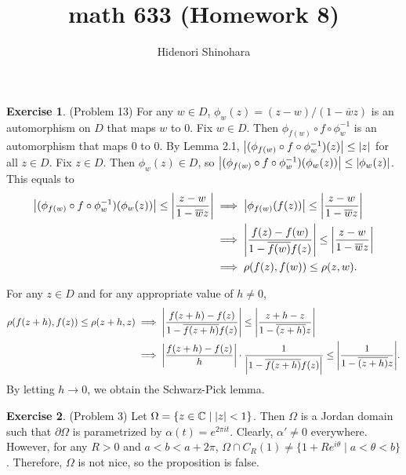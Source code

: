 \documentclass[12pt, psamsfonts]{amsart}
\theoremstyle{definition}
\newtheorem*{exer}{Exercise}
\theoremstyle{remark}
\numberwithin{equation}{section}
\begin{document}
\title{math 633 (Homework 8)}
\author{Hidenori Shinohara}
\maketitle

\begin{exer}{(Problem 13)}
  For any $w \in D$, $\phi_w(z) = (z - w) / (1 - \overline{w}z)$ is an automorphism on $D$ that maps $w$ to $0$.
  Fix $w \in D$.
  Then $\phi_{f(w)} \circ f \circ \phi_w^{-1}$ is an automorphism that maps 0 to 0.
  By Lemma 2.1, $\abs{(\phi_{f(w)} \circ f \circ \phi_w^{-1})(z)} \leq \abs{z}$ for all $z \in D$.
  Fix $z \in D$.
  Then $\phi_w(z) \in D$, so $\abs{(\phi_{f(w)} \circ f \circ \phi_w^{-1})(\phi_w(z))} \leq \abs{\phi_w(z)}$.
  This equals to
  \begin{align*}
    \abs{(\phi_{f(w)} \circ f \circ \phi_w^{-1})(\phi_w(z))} \leq \abs{\frac{z - w}{1 - \overline{w}z}}
      &\implies \abs{\phi_{f(w)}(f(z))} \leq \abs{\frac{z - w}{1 - \overline{w}z}} \\
      &\implies \abs{\frac{f(z) - f(w)}{1 - \overline{f(w)}f(z)}} \leq \abs{\frac{z - w}{1 - \overline{w}z}} \\
      &\implies \rho(f(z), f(w)) \leq \rho(z, w).
  \end{align*}

  For any $z \in D$ and for any appropriate value of $h \ne 0$,
  \begin{align*}
    \rho(f(z + h), f(z)) \leq \rho(z + h, z)
      &\implies \abs{\frac{f(z + h) - f(z)}{1 - \overline{f(z + h)}f(z)}} \leq \abs{\frac{z + h - z}{1 - \overline{(z + h)}z}} \\
      &\implies \abs{\frac{f(z + h) - f(z)}{h}} \cdot \frac{1}{\abs{1 - \overline{f(z + h)}f(z)}} \leq \abs{\frac{1}{1 - \overline{(z + h)}z}}.
  \end{align*}
  By letting $h \rightarrow 0$, we obtain the Schwarz-Pick lemma.
\end{exer}

\begin{exer}{(Problem 3)}
  Let $\Omega = \{ z \in \mathbb{C} \mid \abs{z} < 1 \}$.
  Then $\Omega$ is a Jordan domain such that $\partial\Omega$ is parametrized by $\alpha(t) = e^{2\pi it}$.
  Clearly, $\alpha' \ne 0$ everywhere.
  However, for any $R > 0$ and $a < b < a + 2\pi$, $\Omega \cap C_R(1) \ne \{ 1 + Re^{i\theta} \mid a < \theta < b \}$.
  Therefore, $\Omega$ is not nice, so the proposition is false.
\end{exer}
\end{document}
